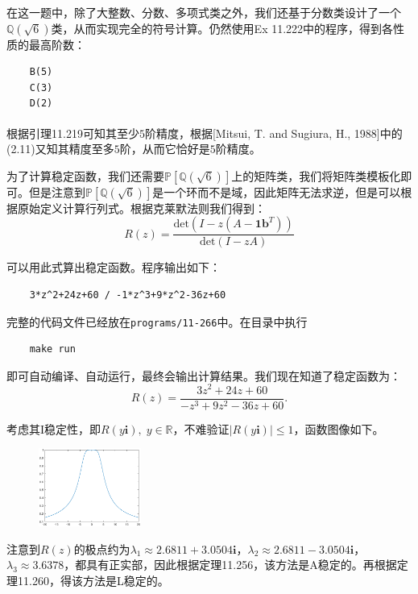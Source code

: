 \documentclass[twoside,a4paper]{article}
\begin{document}
\;\;\;\;\;\;在这一题中，除了大整数、分数、多项式类之外，我们还基于分数类设计了一个$\mathbb{Q}(\sqrt{6})$类，从而实现完全的符号计算。仍然使用Ex 11.222中的程序，得到各性质的最高阶数：
\begin{lstlisting}
    B(5)
    C(3)
    D(2)
\end{lstlisting}

根据引理11.219可知其至少$5$阶精度，根据[Mitsui, T.  and  Sugiura, H., 1988]\textsuperscript{\cite{1988A}}中的(2.11)又知其精度至多$5$阶，从而它恰好是$5$阶精度。

为了计算稳定函数，我们还需要$\mathbb{P}[\mathbb{Q}(\sqrt{6})]$上的矩阵类，我们将矩阵类模板化即可。但是注意到$\mathbb{P}[\mathbb{Q}(\sqrt{6})]$是一个环而不是域，因此矩阵无法求逆，但是可以根据原始定义计算行列式。根据克莱默法则我们得到：
\begin{equation*}
    R(z)=\frac{\text{det}(I-z(A-\mathbf{1}\mathbf{b}^T))}{\text{det}(I-zA)}
\end{equation*}

可以用此式算出稳定函数。程序输出如下：
\begin{lstlisting}
    3*z^2+24z+60 / -1*z^3+9*z^2-36z+60
\end{lstlisting}

完整的代码文件已经放在\verb|programs/11-266|中。在目录中执行
\begin{lstlisting}
    make run
\end{lstlisting}

即可自动编译、自动运行，最终会输出计算结果。我们现在知道了稳定函数为：
\begin{equation*}
    R(z)=\frac{3z^2+24z+60}{-z^3+9z^2-36z+60}.
\end{equation*}

考虑其I稳定性，即$R(y\mathbf{i}),\;y\in\mathbb{R}$，不难验证$|R(y\mathbf{i})|\leq 1$，函数图像如下。

\begin{figure}[H]
    \centering
    \includegraphics[width=0.3\textwidth]{figures/11-266.eps}
\end{figure}

注意到$R(z)$的极点约为$\lambda_1\approx 2.6811+3.0504\mathbf{i}$，$\lambda_2\approx 2.6811-3.0504\mathbf{i}$，$\lambda_3\approx 3.6378$，都具有正实部，因此根据定理11.256，该方法是A稳定的。再根据定理11.260，得该方法是L稳定的。
\end{document}
